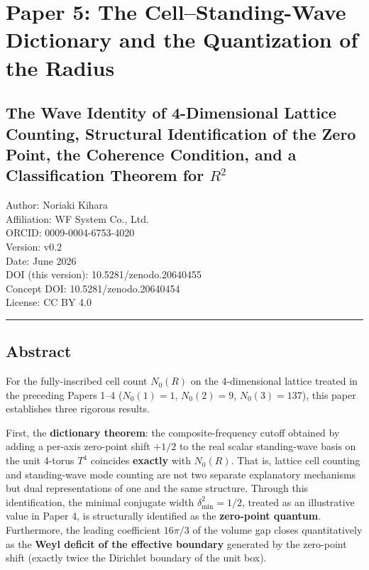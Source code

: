 \documentclass[
]{article}
\author{}
\date{}
\begin{document}
\section{Paper 5: The Cell--Standing-Wave Dictionary and the
Quantization of the
Radius}\label{paper-5-the-cellstanding-wave-dictionary-and-the-quantization-of-the-radius}

\subsection{\texorpdfstring{The Wave Identity of 4-Dimensional Lattice
Counting, Structural Identification of the Zero Point, the Coherence
Condition, and a Classification Theorem for
\(R^2\)}{The Wave Identity of 4-Dimensional Lattice Counting, Structural Identification of the Zero Point, the Coherence Condition, and a Classification Theorem for R\^{}2}}\label{the-wave-identity-of-4-dimensional-lattice-counting-structural-identification-of-the-zero-point-the-coherence-condition-and-a-classification-theorem-for-r2}

Author: Noriaki Kihara\\
Affiliation: WF System Co., Ltd.\\
ORCID: 0009-0004-6753-4020\\
Version: v0.2\\
Date: June 2026\\
DOI (this version): 10.5281/zenodo.20640455\\
Concept DOI: 10.5281/zenodo.20640454\\
License: CC BY 4.0

\begin{center}\rule{0.5\linewidth}{0.5pt}\end{center}

\subsection{Abstract}\label{abstract}

For the fully-inscribed cell count \(N_0(R)\) on the 4-dimensional
lattice treated in the preceding Papers 1--4 (\(N_0(1)=1\),
\(N_0(2)=9\), \(N_0(3)=137\)), this paper establishes three rigorous
results.

First, the \textbf{dictionary theorem}: the composite-frequency cutoff
obtained by adding a per-axis zero-point shift \(+1/2\) to the real
scalar standing-wave basis on the unit 4-torus \(T^4\) coincides
\textbf{exactly} with \(N_0(R)\). That is, lattice cell counting and
standing-wave mode counting are not two separate explanatory mechanisms
but dual representations of one and the same structure. Through this
identification, the minimal conjugate width \(\delta_{\min}^2=1/2\),
treated as an illustrative value in Paper 4, is structurally identified
as the \textbf{zero-point quantum}. Furthermore, the leading coefficient
\(16\pi/3\) of the volume gap closes quantitatively as the \textbf{Weyl
deficit of the effective boundary} generated by the zero-point shift
(exactly twice the Dirichlet boundary of the unit box).
\end{document}
